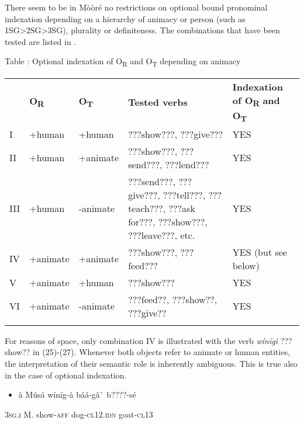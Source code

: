\documentclass[output=paper]{langsci/langscibook}
\begin{document}
{{There seem to be in M\`{o}\`{o}r\'{e} no restrictions on optional bound pronominal indexation depending on a hierarchy of animacy or person (such as 1SG{\textgreater}2SG{\textgreater}3SG), plurality or definiteness. The combinations that have been tested are listed in .

\begin{styleTabellenberschrift}
\label{bkm:Ref444780805}Table : Optional indexation of O\textsubscript{R} and O\textsubscript{T} depending on animacy
\end{styleTabellenberschrift}

\begin{tabular}{lllll} & \textbf{O}\textbf{\textsubscript{R}} & \textbf{O}\textbf{\textsubscript{T}} & \textbf{Tested verbs} & \textbf{Indexation of O}\textbf{\textsubscript{R}}\textbf{ and O}\textbf{\textsubscript{T}}\textbf{ }\\
\lsptoprule
I & +human & +human & ???show???, ???give??? & YES\\
II & +human & +animate & ???show???, ???send???, ???lend??? & YES\\
III & +human & {}-animate & ???send???, ???give???, ???tell???, ???teach???, ???ask for???, ???show???, ???leave???, etc. & YES\\
IV & +animate & +animate & ???show???, ???feed??? & YES (but see below)\\
V & +animate & +human & ???show??? & YES\\
VI & +animate & {}-animate & ???feed??, ???show??, ???give?? & YES\\
\lspbottomrule
\end{tabular}
For reasons of space, only combination IV is illustrated with the verb \textit{w\'{i}n\'{i}g\`{i}} ???show?? in (25){}-(27). Whenever both objects refer to animate or human entities, the interpretation of their semantic role is inherently ambiguous. This is true also in the case of optional indexation.

\begin{itemize}
\item \begin{styleNumberedEX}
\label{bkm:Ref424217838}\`{a}    M\'{u}s\'{a}  w\'{i}n\'{i}g-\`{a}  b\'{a}\'{a}-g\~{a}\`{ }    b????-s\'{e}
\end{styleNumberedEX}\end{itemize}
\begin{styleGloss}
\textsc{3sg.i  }  M.  show-\textsc{aff}  dog-\textsc{cl12.idn}  goat-\textsc{cl13}
\end{styleGloss}

}}
\end{document}
